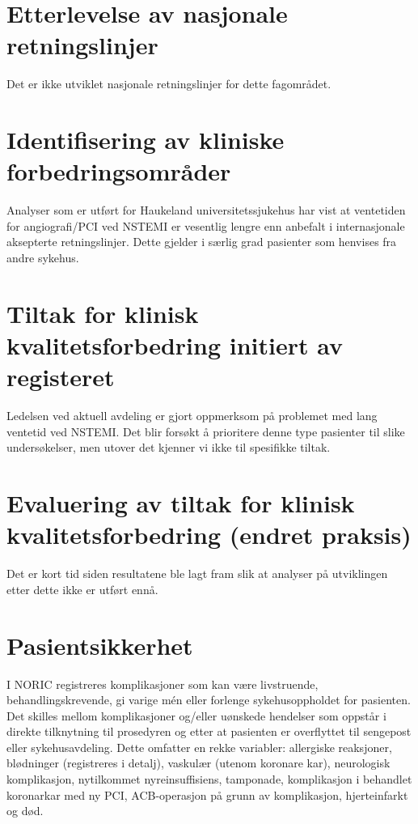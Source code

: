 \documentclass[norsk, a4paper]{report}
\begin{document}
\section{Etterlevelse av nasjonale retningslinjer}\label{sec:retbru}
Det er ikke utviklet nasjonale retningslinjer for dette fagområdet.

\section{Identifisering av kliniske forbedringsområder}\label{sec:ide}
Analyser som er utført for Haukeland universitetssjukehus har vist at ventetiden for angiografi/PCI ved NSTEMI er vesentlig lengre enn anbefalt i internasjonale aksepterte retningslinjer. Dette gjelder i særlig grad pasienter som henvises fra andre sykehus.

\section{Tiltak for klinisk kvalitetsforbedring initiert av registeret}\label{sec:brures}
Ledelsen ved aktuell avdeling er gjort oppmerksom på problemet med lang ventetid ved NSTEMI. Det blir forsøkt å prioritere denne type pasienter til slike undersøkelser, men utover det kjenner vi ikke til spesifikke tiltak.

\section{Evaluering av tiltak for klinisk kvalitetsforbedring (endret praksis)}\label{sec:evakva}
Det er kort tid siden resultatene ble lagt fram slik at analyser på utviklingen etter dette ikke er utført ennå.

\section{Pasientsikkerhet}\label{sec:kom}
I NORIC registreres komplikasjoner som kan være livstruende, behandlingskrevende, gi varige mén eller forlenge sykehusoppholdet for pasienten. Det skilles mellom komplikasjoner og/eller uønskede hendelser som oppstår i direkte tilknytning til prosedyren og etter at pasienten er overflyttet til sengepost eller sykehusavdeling. Dette omfatter en rekke variabler: allergiske reaksjoner, blødninger (registreres i detalj), vaskulær (utenom koronare kar), neurologisk komplikasjon, nytilkommet nyreinsuffisiens, tamponade, komplikasjon i behandlet koronarkar med ny PCI, ACB-operasjon på grunn av komplikasjon, hjerteinfarkt og død.
\end{document}
